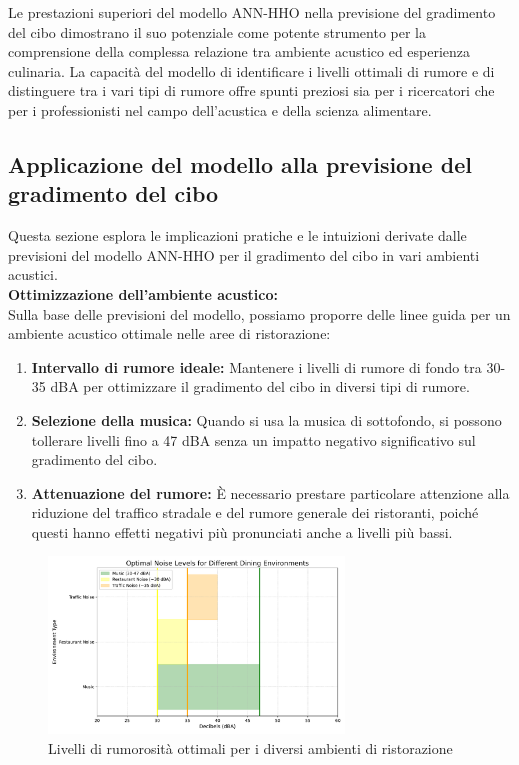 Le prestazioni superiori del modello ANN-HHO nella previsione del gradimento del cibo dimostrano il suo potenziale come potente strumento per la comprensione della complessa relazione tra ambiente acustico ed esperienza culinaria. La capacità del modello di identificare i livelli ottimali di rumore e di distinguere tra i vari tipi di rumore offre spunti preziosi sia per i ricercatori che per i professionisti nel campo dell'acustica e della scienza alimentare.

\subsection{Applicazione del modello alla previsione del gradimento del cibo}
\noindent

Questa sezione esplora le implicazioni pratiche e le intuizioni derivate dalle previsioni del modello ANN-HHO per il gradimento del cibo in vari ambienti acustici. \\
\textbf{Ottimizzazione dell'ambiente acustico:} \\
Sulla base delle previsioni del modello, possiamo proporre delle linee guida per un ambiente acustico ottimale nelle aree di ristorazione:
\begin{enumerate}
    \item \textbf{Intervallo di rumore ideale:} Mantenere i livelli di rumore di fondo tra 30-35 dBA per ottimizzare il gradimento del cibo in diversi tipi di rumore.
    \item \textbf{Selezione della musica:} Quando si usa la musica di sottofondo, si possono tollerare livelli fino a 47 dBA senza un impatto negativo significativo sul gradimento del cibo.
    \item \textbf{Attenuazione del rumore:} È necessario prestare particolare attenzione alla riduzione del traffico stradale e del rumore generale dei ristoranti, poiché questi hanno effetti negativi più pronunciati anche a livelli più bassi.
\end{enumerate}

\begin{figure}[H]
      \centering
      \includegraphics[width=0.7\textwidth]{Chapters/Figures/optimal_noise_levels_improved.pdf} %
      \caption{\small Livelli di rumorosità ottimali per i diversi ambienti di ristorazione}
      \label{fig:graph_label}
\end{figure}

